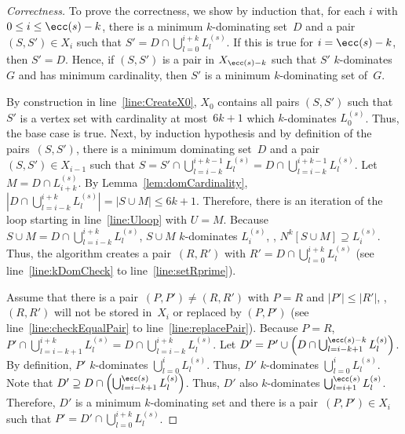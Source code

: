 \begin{proof}
    [Correctness]
%
To prove the correctness, we show by induction that, for each $i$ with $0 \leq i \leq \ecc(s) - k$, there is a minimum $k$-dominating set~$D$ and a pair~$(S, S') \in X_i$ such that $S' = D \cap \bigcup_{l=0}^{i+k} L_l^{(s)}$.
If this is true for $i = \ecc(s) - k$, then $S' = D$.
Hence, if $(S, S')$ is a pair in $X_{\ecc(s) - k}$ such that $S'$ $k$-dominates $G$ and has minimum cardinality, then $S'$ is a minimum $k$-dominating set of~$G$.

By construction in line~\ref{line:CreateX0}, $X_0$ contains all pairs $(S, S')$ such that $S'$ is a vertex set with cardinality at most~$6k + 1$ which $k$-dominates $L_0^{(s)}$.
Thus, the base case is true.
Next, by induction hypothesis and by definition of the pairs~$(S, S')$, there is a minimum dominating set~$D$ and a pair~$(S, S') \in X_{i-1}$ such that $S = S' \cap \bigcup_{l=i-k}^{i+k-1} L_l^{(s)} = D \cap \bigcup_{l=i-k}^{i+k-1} L_l^{(s)}$.
Let $M = D \cap L_{i+k}^{(s)}$.
By Lemma~\ref{lem:domCardinality}, $\left | D \cap \bigcup_{l=i-k}^{i+k} L_l^{(s)} \right | = |S \cup M| \leq 6k + 1$.
Therefore, there is an iteration of the loop starting in line~\ref{line:Uloop} with $U = M$.
Because $S \cup M = D \cap \bigcup_{l=i-k}^{i+k} L_l^{(s)}$, $S \cup M$ $k$-dominates $L_i^{(s)}$, \ie, $N^k[S \cup M] \supseteq L_{i}^{(s)}$.
Thus, the algorithm creates a pair~$(R, R')$ with $R' = D \cap \bigcup_{l=0}^{i+k} L_l^{(s)}$ (see line~\ref{line:kDomCheck} to line~\ref{line:setRprime}).

Assume that there is a pair~$(P, P') \neq (R, R')$ with $P = R$ and $|P'| \leq |R'|$, \ie, $(R, R')$ will not be stored in~$X_i$ or replaced by $(P, P')$ (see line~\ref{line:checkEqualPair} to line~\ref{line:replacePair}).
Because $P = R$, $P' \cap \bigcup_{l=i-k+1}^{i+k} L_l^{(s)} = D \cap \bigcup_{l=i-k}^{i+k} L_l^{(s)}$.
Let $D' = P' \cup \left ( D \cap \bigcup_{l=i-k+1}^{\ecc(s)-k} L_l^{(s)} \right )$.
By definition, $P'$ $k$-dominates $\bigcup_{l=0}^{i} L_l^{(s)}$.
Thus, $D'$ $k$-dominates $\bigcup_{l=0}^{i} L_l^{(s)}$.
Note that $D' \supseteq D \cap \left ( \bigcup_{l=i-k+1}^{\ecc(s)} L_l^{(s)} \right )$.
Thus, $D'$ also $k$-dominates $\bigcup_{l=i+1}^{\ecc(s)} L_l^{(s)}$.
Therefore, $D'$ is a minimum $k$-dominating set and there is a pair~$(P, P') \in X_i$ such that $P' = D' \cap \bigcup_{l=0}^{i+k} L_l^{(s)}$.
\end{proof}

